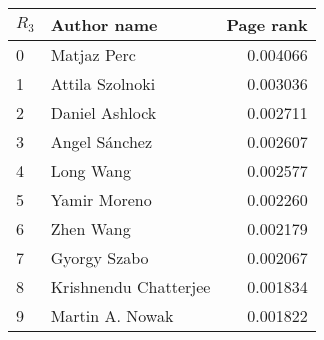 \begin{tabular}{llr}
\toprule
\(R_3\) &      Author name &  Page rank \\
\midrule
0 &            Matjaz Perc &   0.004066 \\
1 &        Attila Szolnoki &   0.003036 \\
2 &         Daniel Ashlock &   0.002711 \\
3 &          Angel Sánchez &   0.002607 \\
4 &              Long Wang &   0.002577 \\
5 &           Yamir Moreno &   0.002260 \\
6 &              Zhen Wang &   0.002179 \\
7 &           Gyorgy Szabo &   0.002067 \\
8 &  Krishnendu Chatterjee &   0.001834 \\
9 &        Martin A. Nowak &   0.001822 \\
\bottomrule
\end{tabular}
